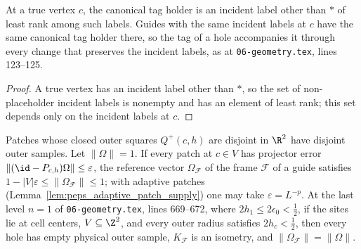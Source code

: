 \begin{lemma}
    \label{lem:peps_guide_frame_tags}
    \leanok
    At a true vertex $c$, the canonical tag holder is an incident label other than $\ast$ of least rank among such labels. Guides with the same
    incident labels at $c$ have the same canonical tag holder there, so the
    tag of a hole accompanies it through every change that preserves the incident
    labels, as at \texttt{06-geometry.tex}, lines 123--125.
\end{lemma}

\begin{proof}\leanok
    A true vertex has an incident label other than $\ast$, so the set
    of non-placeholder incident labels is nonempty and has an element of least rank; this set depends only on the incident labels at $c$.
\end{proof}

\begin{lemma}
    \label{thm:peps_guide_frame_norm}
    \leanok
    Patches whose closed outer squares $Q^+(c,h)$ are disjoint in $\R^2$ have disjoint
    outer samples. Let $\lVert\Omega\rVert=1$. If every patch at $c\in V$
    has projector error $\lVert(\id-P_{c,h})\Omega\rVert\le\varepsilon$, the reference vector $\Omega_{\mathcal F}$ of
    the frame $\mathcal F$ of a guide satisfies
    $1-\lvert V\rvert\varepsilon\le\lVert\Omega_{\mathcal F}\rVert\le1$; with
    adaptive patches (Lemma~\ref{lem:peps_adaptive_patch_supply}) one may take $\varepsilon=L^{-p}$. At the last level
    $n=1$ of \texttt{06-geometry.tex}, lines 669--672, where
    $2h_1\le2\epsilon_0<\tfrac12$, if the sites lie at cell
    centers, $V\subseteq\Z^2$, and every outer
    radius satisfies $2h_c<\tfrac12$, then every hole has empty physical outer
    sample, $K_{\mathcal F}$ is an isometry, and
    $\lVert\Omega_{\mathcal F}\rVert=\lVert\Omega\rVert$.
\end{lemma}

